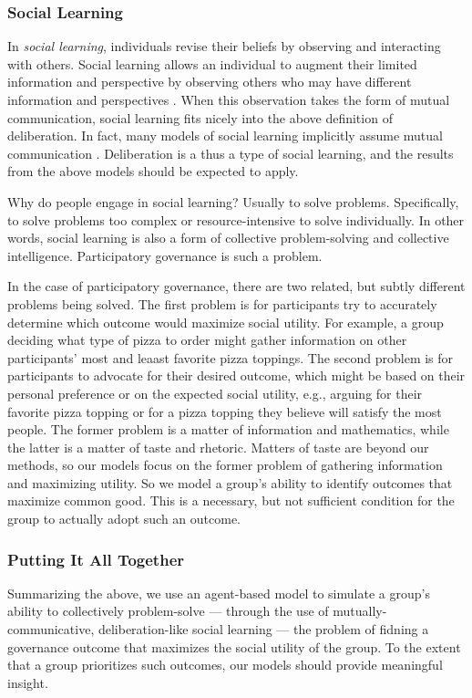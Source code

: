 \documentclass[manuscript,screen,review,acmsmall]{acmart}
\begin{document}
\subsubsection{Social Learning\label{subsec:social}}
In {\em social learning}, individuals revise their beliefs by observing and interacting with others.
Social learning allows an individual to augment their limited information and perspective by observing others who may have different information
and perspectives \cite{hong_interpreted_2009, golub_naive_2010}.
When this observation takes the form of mutual communication,
social learning fits nicely into the above definition of deliberation.
In fact, many models of social learning implicitly assume mutual communication
\cite{golub_naive_2010, lazer_network_2007, mason_collaborative_2012, barkoczi_social_2016, gomez_clustering_2019}.
Deliberation is a thus a type of social learning,
and the results from the above models should be expected to apply.

Why do people engage in social learning?
Usually to solve problems.
Specifically, to solve problems too complex or resource-intensive to
solve individually.
In other words, social learning is also a form of collective
problem-solving and collective intelligence.
Participatory governance is such a problem.

In the case of participatory governance,
there are two related, but subtly different problems being solved.
The first problem is for participants try to accurately determine which outcome would maximize social utility.
For example, a group deciding what type of pizza to order might gather information on other participants' most and leaast favorite pizza toppings.
The second problem is for participants to
advocate for their desired outcome,
which might be based on their personal preference
or on the expected social utility,
e.g., arguing for their favorite pizza topping
or for a pizza topping they believe will satisfy the most people.
The former problem is a matter of information and mathematics,
while the latter is a matter of taste and rhetoric.
Matters of taste are beyond our methods, so our models focus on the former problem of gathering information and maximizing utility.
So we model a group's ability to identify outcomes that maximize
common good.
This is a necessary, but not sufficient condition for the group to actually
adopt such an outcome.

\subsubsection{Putting It All Together}
Summarizing the above, we use an agent-based model to simulate a group's
ability to collectively problem-solve
---
through the use of mutually-communicative,
deliberation-like social learning
---
the problem of fidning a governance outcome that maximizes the social utility of the group.
To the extent that a group prioritizes such outcomes,
our models should provide meaningful insight.
\end{document}
